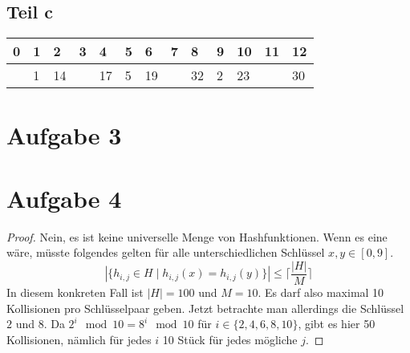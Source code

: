 \documentclass[10pt,a4paper]{article}
\begin{document}
\subsection{Teil c}
\begin{tabular}{l|l|l|l|l|l|l|l|l|l|l|l|l}
  0 & 1 & 2 & 3 & 4 & 5 & 6 & 7 & 8 & 9 & 10 & 11 & 12\\
  \hline
    & 1 & 14 &   & 17 & 5 & 19 &   & 32 & 2 & 23 &  & 30
\end{tabular}

\section{Aufgabe 3}

\section{Aufgabe 4}
\begin{proof}
  Nein, es ist keine universelle Menge von Hashfunktionen.
  Wenn es eine wäre, müsste folgendes gelten für alle unterschiedlichen Schlüssel $x, y \in [0, 9]$.
  \begin{equation}
    |\{ h_{i,j} \in H \mid h_{i,j}(x) = h_{i,j}(y) \}| \le \lceil \frac{|H|}{M} \rceil
  \end{equation}
  In diesem konkreten Fall ist $|H| = 100$ und $M = 10$.
  Es darf also maximal 10 Kollisionen pro Schlüsselpaar geben.
  Jetzt betrachte man allerdings die Schlüssel $2$ und $8$.
  Da $2^{i} \mod 10 = 8^{i} \mod 10$ für $i \in \{ 2, 4, 6, 8, 10 \}$, gibt es hier 50 Kollisionen, nämlich für jedes $i$ 10 Stück für jedes mögliche $j$.
\end{proof}
\end{document}
